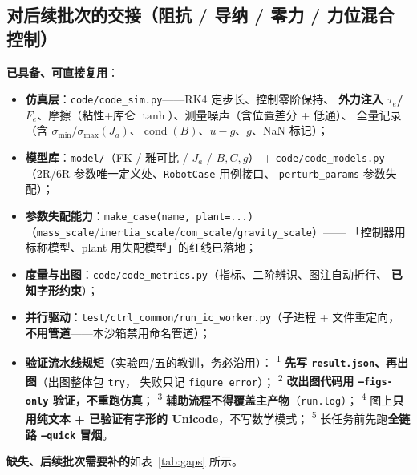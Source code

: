 \documentclass[11pt,a4paper]{ctexart}
\newcommand{\stage}[1]{\textsuperscript{#1}}
\begin{document}
\subsection{对后续批次的交接（阻抗 / 导纳 / 零力 / 力位混合控制）}\label{sec:handover}

\textbf{已具备、可直接复用}：

\begin{itemize}[leftmargin=1.6em,itemsep=2pt]
\item \textbf{仿真层}：\texttt{code/code\_sim.py}——RK4 定步长、控制零阶保持、
  \textbf{外力注入 $\tau_e$/$F_e$}、摩擦（粘性+库仑 $\tanh$）、测量噪声（含位置差分 + 低通）、
  全量记录（含 $\sigma_{\min}/\sigma_{\max}(J_a)$、$\operatorname{cond}(B)$、$u-g$、$g$、NaN 标记）；
\item \textbf{模型库}：\texttt{model/}（FK / 雅可比 / \textbf{$\dot J_a$} / $B,C,g$）
  + \texttt{code/code\_models.py}（2R/6R 参数唯一定义处、\texttt{RobotCase} 用例接口、
  \texttt{perturb\_params} 参数失配）；
\item \textbf{参数失配能力}：\texttt{make\_case(name, plant=...)}
  （\texttt{mass\_scale}/\texttt{inertia\_scale}/\texttt{com\_scale}/\texttt{gravity\_scale}）——
  「控制器用标称模型、plant 用失配模型」的红线已落地；
\item \textbf{度量与出图}：\texttt{code/code\_metrics.py}（指标、二阶辨识、图注自动折行、
  \textbf{已知字形约束}）；
\item \textbf{并行驱动}：\texttt{test/ctrl\_common/run\_ic\_worker.py}（子进程 + 文件重定向，
  \textbf{不用管道}——本沙箱禁用命名管道）；
\item \textbf{验证流水线规矩}（实验四/五的教训，务必沿用）：
  \stage{1} \textbf{先写 \texttt{result.json}、再出图}（出图整体包 \texttt{try}，
  失败只记 \texttt{figure\_error}）；
  \stage{2} \textbf{改出图代码用 \texttt{--figs-only} 验证，不重跑仿真}；
  \stage{3} \textbf{辅助流程不得覆盖主产物}（\texttt{run.log}）；
  \stage{4} 图上\textbf{只用纯文本 + 已验证有字形的 Unicode}，不写数学模式；
  \stage{5} 长任务前先跑\textbf{全链路 \texttt{--quick} 冒烟}。
\end{itemize}

\textbf{缺失、后续批次需要补的}如表~\ref{tab:gaps} 所示。
\end{document}
